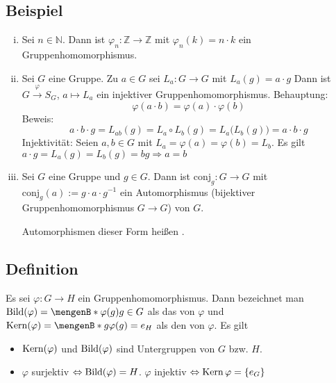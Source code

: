 \subsection[Beispiele für Gruppenhomomorphismen]{Beispiel} %
\label{sub:111}
\begin{enumerate}[(i)]
	\item Sei $n \in \mathds{N}$. Dann ist $\varphi_n : \mathds{Z} \to \mathds{Z}$ mit $\varphi_n(k)= n \cdot k$ ein Gruppenhomomorphismus. 
	\item Sei $G$ eine Gruppe. Zu $a \in G$ sei $L_a : G \to G$ mit $L_a(g) = a \cdot g$ 
	Dann ist $G \xrightarrow{\varphi}  S_G$, $a \mapsto L_a$ ein injektiver Gruppenhomomorphismus. Behauptung:
	\[
		\varphi(a \cdot b) = \varphi(a) \cdot \varphi(b)
	\]
	Beweis:
	\[
		a \cdot b \cdot g =L_{ab} (g) = L_a \circ L_b (g) = L_a \big( L_b(g)\big) = a \cdot b \cdot g
	\]
	Injektivität: Seien $a,b \in G$ mit $L_a = \varphi(a) = \varphi(b) = L_b$. Es gilt $a \cdot g = L_a (g) = L_b (g) = b g \Rightarrow  a = b$
	\item Sei $G$ eine Gruppe und $g \in G$. Dann ist $\mathrm{conj}_g : G \to G$ mit $\mathrm{conj}_g (a) := g \cdot a \cdot g ^{-1}$ ein Automorphismus (bijektiver
	Gruppenhomomorphismus $G \to G$) von $G$.
	
	Automorphismen dieser Form heißen  .
\end{enumerate}

\subsection[Definition: Bild und Kern eines Gruppenhomomorphismus]{Definition} %
\label{sub:112}
Es sei $\varphi : G \to H$ ein Gruppenhomomorphismus. 
Dann bezeichnet man $\bild (\varphi) = \set[\varphi(g)]{g \in G} $  als das  von $\varphi$ und $\Kern(\varphi) = \set[g]{\varphi(g) = e_H} $ als den  von $\varphi$.
Es gilt 
\begin{itemize}
	\item $\operatorname{Kern} (\varphi)$ und $\operatorname{Bild} ( \varphi)$ sind Untergruppen von $G$ bzw. $H$.
	\item $\varphi$ surjektiv $\Leftrightarrow \operatorname{Bild} (\varphi) = H$. $\varphi$ injektiv $\Leftrightarrow \operatorname{Kern} \varphi = \{ e_G\}$
\end{itemize}

